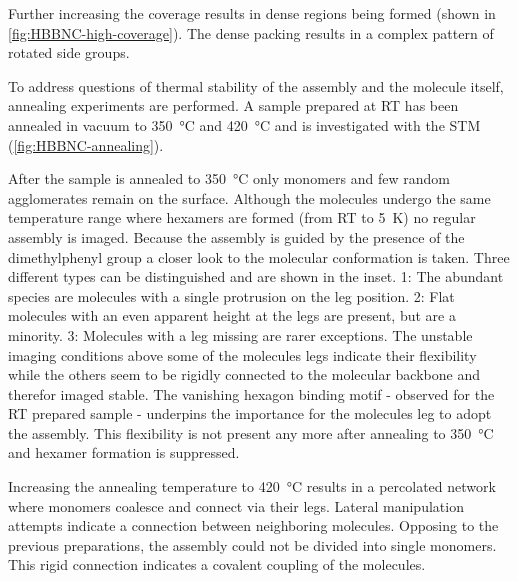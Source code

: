 Further increasing the coverage results in dense regions being formed (shown in \autoref{fig:HBBNC-high-coverage}). The dense packing results in a complex pattern of rotated side groups.

To address questions of thermal stability of the assembly and the molecule itself, annealing experiments are performed. A sample prepared at RT has been annealed in vacuum to \SI{350}{\celsius} and \SI{420}{\celsius} and is investigated with the STM (\autoref{fig:HBBNC-annealing}).

After the sample is annealed to \SI{350}{\celsius} only monomers and few random agglomerates remain on the surface. Although the molecules undergo the same temperature range where hexamers are formed (from RT to \SI{5}{\kelvin}) no regular assembly is imaged. Because the assembly is guided by the presence of the dimethylphenyl group a closer look to the molecular conformation is taken. Three different types can be distinguished and are shown in the inset. 
1: The abundant species are molecules with a single protrusion on the leg position.
2: Flat molecules with an even apparent height at the legs are present, but are a minority.
3: Molecules with a leg missing are rarer exceptions.
The unstable imaging conditions above some of the molecules legs indicate their flexibility while the others seem to be rigidly connected to the molecular backbone and therefor imaged stable. The vanishing hexagon binding motif - observed for the RT prepared sample - underpins the importance for the molecules leg to adopt the assembly. This flexibility is not present any more after annealing to \SI{350}{\celsius} and hexamer formation is suppressed.

Increasing the annealing temperature to \SI{420}{\celsius} results in a percolated network where monomers  coalesce and connect via their legs. Lateral manipulation attempts indicate a connection between neighboring molecules. Opposing to the previous preparations, the assembly could not be divided into single monomers. This rigid connection indicates a covalent coupling of the molecules. 


